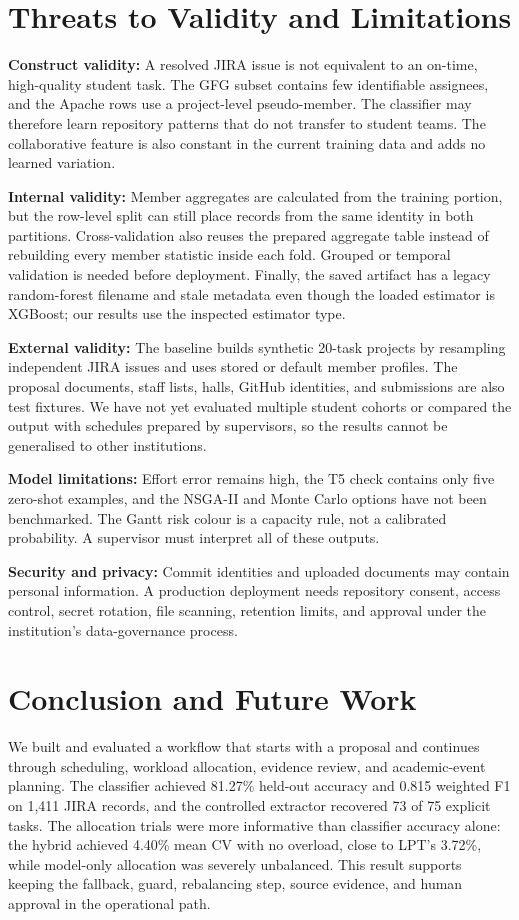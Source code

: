 \documentclass[conference]{IEEEtran}
\begin{document}
\section{Threats to Validity and Limitations}
\textbf{Construct validity:} A resolved JIRA issue is not equivalent to an on-time, high-quality student task. The GFG subset contains few identifiable assignees, and the Apache rows use a project-level pseudo-member. The classifier may therefore learn repository patterns that do not transfer to student teams. The collaborative feature is also constant in the current training data and adds no learned variation.

\textbf{Internal validity:} Member aggregates are calculated from the training portion, but the row-level split can still place records from the same identity in both partitions. Cross-validation also reuses the prepared aggregate table instead of rebuilding every member statistic inside each fold. Grouped or temporal validation is needed before deployment. Finally, the saved artifact has a legacy random-forest filename and stale metadata even though the loaded estimator is XGBoost; our results use the inspected estimator type.

\textbf{External validity:} The baseline builds synthetic 20-task projects by resampling independent JIRA issues and uses stored or default member profiles. The proposal documents, staff lists, halls, GitHub identities, and submissions are also test fixtures. We have not yet evaluated multiple student cohorts or compared the output with schedules prepared by supervisors, so the results cannot be generalised to other institutions.

\textbf{Model limitations:} Effort error remains high, the T5 check contains only five zero-shot examples, and the NSGA-II and Monte Carlo options have not been benchmarked. The Gantt risk colour is a capacity rule, not a calibrated probability. A supervisor must interpret all of these outputs.

\textbf{Security and privacy:} Commit identities and uploaded documents may contain personal information. A production deployment needs repository consent, access control, secret rotation, file scanning, retention limits, and approval under the institution's data-governance process.

\section{Conclusion and Future Work}
We built and evaluated a workflow that starts with a proposal and continues through scheduling, workload allocation, evidence review, and academic-event planning. The classifier achieved 81.27\% held-out accuracy and 0.815 weighted F1 on 1,411 JIRA records, and the controlled extractor recovered 73 of 75 explicit tasks. The allocation trials were more informative than classifier accuracy alone: the hybrid achieved 4.40\% mean CV with no overload, close to LPT's 3.72\%, while model-only allocation was severely unbalanced. This result supports keeping the fallback, guard, rebalancing step, source evidence, and human approval in the operational path.
\end{document}
